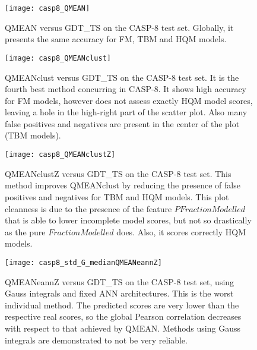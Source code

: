 \begin{figure}[H]
	\begin{center}
		\texttt{[image: casp8\_QMEAN]}
		\caption[QMEAN versus GDT\_TS on the CASP-8 test set]{QMEAN versus GDT\_TS on the CASP-8 test set. Globally, it presents the same accuracy for FM, TBM and HQM models.}
		\label{fig:casp8_qmean}
	\end{center}
\end{figure}

\begin{figure}[H]
	\begin{center}
		\texttt{[image: casp8\_QMEANclust]}
		\caption[QMEANclust versus GDT\_TS on the CASP-8 test set]{QMEANclust versus GDT\_TS on the CASP-8 test set. It is the fourth best method concurring in CASP-8. It shows high accuracy for FM models, however does not assess exactly HQM model scores, leaving a hole in the high-right part of the scatter plot. Also many false positives and negatives are present in the center of the plot (TBM models).}
		\label{fig:casp8_qmeanclust}
	\end{center}
\end{figure}

\begin{figure}[H]
	\begin{center}
		\texttt{[image: casp8\_QMEANclustZ]}
		\caption[QMEANclustZ versus GDT\_TS on the CASP-8 test set]{QMEANclustZ versus GDT\_TS on the CASP-8 test set. This method improves QMEANclust by reducing the presence of false positives and negatives for TBM and HQM models. This plot cleanness is due to the presence of the feature $PFractionModelled$ that is able to lower incomplete model scores, but not so drastically as the pure $FractionModelled$ does. Also, it scores correctly HQM models.}
		\label{fig:casp8_qmeanclustZ}
	\end{center}
\end{figure}

\begin{figure}[H]
	\begin{center}
		\texttt{[image: casp8\_std\_G\_medianQMEANeannZ]}
		\caption[QMEANeannZ versus GDT\_TS on the CASP-8 test set, using Gauss integrals and fixed ANN architectures]{QMEANeannZ versus GDT\_TS on the CASP-8 test set, using Gauss integrals and fixed ANN architectures. This is the worst individual method. The predicted scores are very lower than the respective real scores, so the global Pearson correlation decreases with respect to that achieved by QMEAN. Methods using Gauss integrals are demonstrated to not be very reliable.}
		\label{fig:casp8_std_G_median_qmeaneannZ}
	\end{center}
\end{figure}

